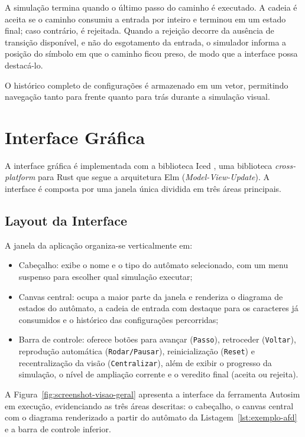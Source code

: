 \documentclass[
    12pt
    ,oneside
    ,a4paper
    ,chapter=TITLE
    ,section=TITLE
    ,sumario=abnt-6027-2012]{abntex2}
\begin{document}
A simulação termina quando o último passo do caminho é executado. A cadeia é aceita se
o caminho consumiu a entrada por inteiro e terminou em um estado final; caso contrário,
é rejeitada. Quando a rejeição decorre da ausência de transição disponível, e não do
esgotamento da entrada, o simulador informa a posição do símbolo em que o caminho ficou
preso, de modo que a interface possa destacá-lo.

O histórico completo de configurações é armazenado em um vetor, permitindo navegação
tanto para frente quanto para trás durante a simulação visual.

\section{Interface Gráfica}
\label{sec:impl-ui}

A interface gráfica é implementada com a biblioteca Iced \cite{iced2022}, uma
biblioteca \textit{cross-platform} para Rust que segue a arquitetura Elm
(\textit{Model-View-Update}). A interface é composta por uma janela única dividida em
três áreas principais.

\subsection{Layout da Interface}
\label{sec:impl-layout}

A janela da aplicação organiza-se verticalmente em:

\begin{itemize}
    \item Cabeçalho: exibe o nome e o tipo do autômato selecionado, com um
          menu suspenso para escolher qual simulação executar;
    \item Canvas central: ocupa a maior parte da janela e renderiza o diagrama
          de estados do autômato, a cadeia de entrada com destaque para os caracteres
          já consumidos e o histórico das configurações percorridas;
    \item Barra de controle: oferece botões para avançar (\texttt{Passo}),
          retroceder (\texttt{Voltar}), reprodução automática (\texttt{Rodar/Pausar}),
          reinicialização (\texttt{Reset}) e recentralização da visão
          (\texttt{Centralizar}), além de exibir o progresso da simulação, o nível de
          ampliação corrente e o veredito final (aceita ou rejeita).
\end{itemize}

A Figura~\ref{fig:screenshot-visao-geral} apresenta a interface da ferramenta
Autosim em execução, evidenciando as três áreas descritas: o cabeçalho, o
canvas central com o diagrama renderizado a partir do autômato da
Listagem~\ref{lst:exemplo-afd} e a barra de controle inferior.
\end{document}
